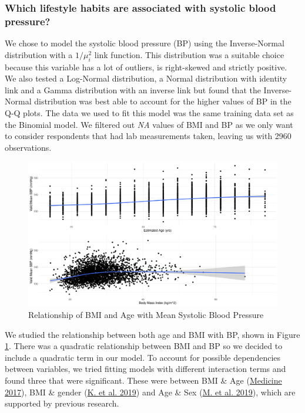 \documentclass[
  11pt,
  twocolumn]{article}
\begin{document}
\hypertarget{which-lifestyle-habits-are-associated-with-systolic-blood-pressure}{%
\subsubsection{Which lifestyle habits are associated with systolic blood
pressure?}\label{which-lifestyle-habits-are-associated-with-systolic-blood-pressure}}

We chose to model the systolic blood pressure (BP) using the
Inverse-Normal distribution with a \(1/\mu_i^2\) link function. This
distribution was a suitable choice because this variable has a lot of
outliers, is right-skewed and strictly positive. We also tested a
Log-Normal distribution, a Normal distribution with identity link and a
Gamma distribution with an inverse link but found that the
Inverse-Normal distribution was best able to account for the higher
values of BP in the Q-Q plots. The data we used to fit this model was
the same training data set as the Binomial model. We filtered out
\emph{NA} values of BMI and BP as we only want to consider respondents
that had lab measurements taken, leaving us with 2960 observations.

\begin{figure}[H]
\includegraphics{Coursework_files/figure-latex/output-relationship-plots-1} \caption{Relationship of BMI and Age with Mean Systolic Blood Pressure}\label{fig:output-relationship-plots}
\end{figure}

We studied the relationship between both age and BMI with BP, shown in
Figure \ref{fig:output-relationship-plots}. There was a quadratic
relationship between BMI and BP so we decided to include a quadratic
term in our model. To account for possible dependencies between
variables, we tried fitting models with different interaction terms and
found three that were significant. These were between BMI \& Age
(\protect\hyperlink{ref-AgeBMI}{Medicine 2017}), BMI \& gender
(\protect\hyperlink{ref-SexBMI}{K. et al. 2019}) and Age \& Sex
(\protect\hyperlink{ref-AgeSex}{M. et al. 2019}), which are supported by
previous research.
\end{document}
